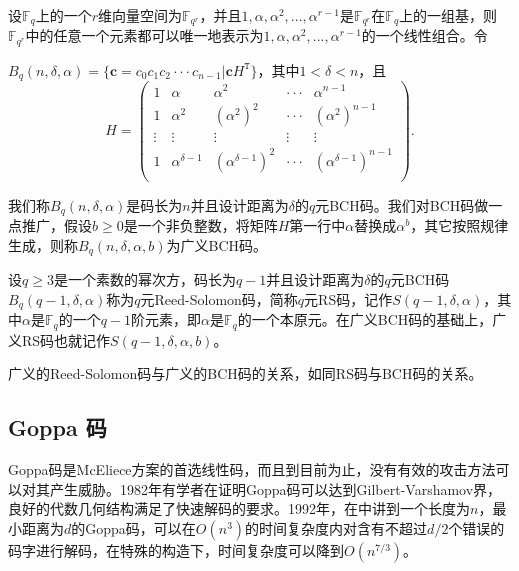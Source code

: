 \begin{define}[BCH码]
	设$\mathbb{F}_q$上的一个$r$维向量空间为$\mathbb{F}_{q^r}$，并且$1, \alpha, \alpha ^ 2, ... , \alpha ^ {r - 1}$是$\mathbb{F}_{q^r}$在$\mathbb{F}_q$上的一组基，则$\mathbb{F}_{q^r}$中的任意一个元素都可以唯一地表示为$1, \alpha, \alpha ^ 2, ... , \alpha ^ {r - 1}$的一个线性组合。令
	
	\centering $B_q(n, \delta, \alpha)=\{\mathbf{c}=c_0c_1c_2···c_{n-1} | \mathbf{c}H^\mathtt{T}\}$，其中$1 < \delta < n$，且
	\begin{equation}       %
	H =
	\left(                 %
	\begin{array}{ccccc}   %
	1 & \alpha & \alpha^2 & ··· & \alpha^{n-1}\\  %
    1 & \alpha^2 & (\alpha^2)^2 & ··· & (\alpha^2)^{n-1}\\  %
    \vdots & \vdots & \vdots & \vdots & \vdots \\
    1 & \alpha^{\delta - 1} & (\alpha^{\delta - 1})^2 & ··· & (\alpha^{\delta - 1})^{n-1}\\
	\end{array}
	\right).                 %
	\end{equation}
	\begin{flushleft}
        我们称$B_q(n, \delta, \alpha)$是码长为$n$并且设计距离为$\delta$的$q$元BCH码。我们对BCH码做一点推广，假设$b \geq 0$是一个非负整数，将矩阵$H$第一行中$\alpha$替换成$\alpha ^ b$，其它按照规律生成，则称$B_q(n, \delta, \alpha, b)$为广义BCH码。
	\end{flushleft}	
\end{define}

\begin{define}[RS码]
	设$q \geq 3$是一个素数的幂次方，码长为$q - 1$并且设计距离为$\delta$的$q$元BCH码$B_q(q - 1, \delta, \alpha)$称为$q$元Reed-Solomon码，简称$q$元RS码，记作$S(q - 1, \delta, \alpha)$，其中$\alpha$是$\mathbb{F}_q$的一个$q - 1$阶元素，即$\alpha$是$\mathbb{F}_q$的一个本原元。在广义BCH码的基础上，广义RS码也就记作$S(q - 1, \delta, \alpha, b)$。
\end{define}

广义的Reed-Solomon码与广义的BCH码的关系，如同RS码与BCH码的关系。

\subsection{Goppa 码}
Goppa码是McEliece方案的首选线性码，而且到目前为止，没有有效的攻击方法可以对其产生威胁。1982年有学者在\cite{Xing2005Goppa}证明Goppa码可以达到Gilbert-Varshamov界，良好的代数几何结构满足了快速解码的要求。1992年，在\cite{Garcia1992Goppa}中讲到一个长度为$n$，最小距离为$d$的Goppa码，可以在$O(n^3)$的时间复杂度内对含有不超过$d/2$个错误的码字进行解码，在特殊的构造下，时间复杂度可以降到$O(n^{7/3})$。

